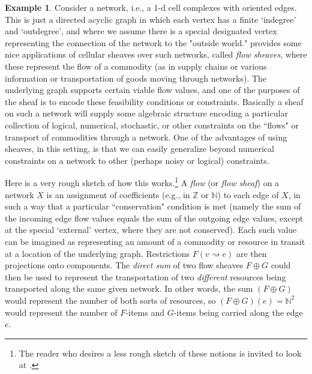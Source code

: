 \documentclass[11pt]{book}
\theoremstyle{definition}
\newtheorem{example}{Example}[section]
\theoremstyle{definition}
\theoremstyle{definition}
\theoremstyle{theorem}
\theoremstyle{definition}
\begin{document}
\begin{example} 
Consider a network, i.e., a 1-d cell complexes with oriented edges. This is just a directed acyclic graph in which each vertex has a finite `indegree' and `outdegree', and where we assume there is a special designated vertex representing the connection of the network to the "outside world." \cite{ghrist_elementary_2014} provides some nice applications of cellular sheaves over such networks, called \textit{flow sheaves}, where these represent the flow of a commodity (as in supply chains or various information or transportation of goods moving through networks). The underlying graph supports certain viable flow values, and one of the purposes of the sheaf is to encode these feasibility conditions or constraints. Basically a sheaf on such a network will supply some algebraic structure encoding a particular collection of logical, numerical, stochastic, or other constraints on the ``flows" or transport of commodities through a network. One of the advantages of using sheaves, in this setting, is that we can easily generalize beyond numerical constraints on a network to other (perhaps noisy or logical) constraints. \par 
Here is a very rough sketch of how this works.\footnote{The reader who desires a less rough sketch of these notions is invited to look at \cite{ghrist_elementary_2014}.} A \textit{flow} (or \textit{flow sheaf}) on a network $X$ is an assignment of coefficients (e.g., in $\mathbb{Z}$ or $\mathbb{N}$) to each edge of $X$, in such a way that a particular ``conservation" condition is met (namely the sum of the incoming edge flow values equals the sum of the outgoing edge values, except at the special `external' vertex, where they are not conserved). Each such value can be imagined as representing an amount of a commodity or resource in transit at a location of the underlying graph. Restrictions $F(v \rightsquigarrow e)$ are then projections onto components. The \textit{direct sum} of two flow sheaves $F \oplus G$ could then be used to represent the transportation of two \textit{different} resources being transported along the same given network. In other words, the sum $(F \oplus G)$ would represent the number of both sorts of resources, so $(F \oplus G)(e) = \mathbb{N}^2$ would represent the number of $F$-items and $G$-items being carried along the edge $e$. 
\end{example}
\end{document}
